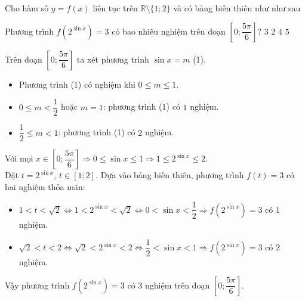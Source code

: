 \begin{ex}%
	Cho hàm số $y=f(x)$ liên tục trên $\mathbb{R}\setminus \{1;2\}$ và có bảng biến thiên như như sau
	\begin{center}
	\end{center}
	Phương trình $f(2^{\sin x})=3$ có bao nhiêu nghiệm trên đoạn $\left[0;\dfrac{5\pi}{6}\right]$?
	\choice
	{\True $3$}
	{$2$}
	{$4$}
	{$5$}
	\loigiai
	{
		Trên đoạn $\left[0;\dfrac{5\pi}{6}\right]$ ta xét phương trình $\sin x=m$ (1).
		\begin{itemize}
			\item Phương trình (1) có nghiệm khi $0\le m\le1$.
			\item $0\le m<\dfrac{1}{2}$ hoặc $m=1$: phương trình (1) có $1$ nghiệm.
			\item $\dfrac{1}{2}\le m <1$: phương trình (1) có $2$ nghiệm.
		\end{itemize}
		Với mọi $x \in \left[0;\dfrac{5\pi}{6}\right] \Rightarrow 0\le \sin x\le1 \Rightarrow 1\le2^{\sin x}\le2$. \\
		Đặt $t=2^{\sin x}$, $t \in [1;2]$.
		Dựa vào bảng biến thiên, phương trình $f(t)=3$ có hai nghiệm thỏa mãn:
		\begin{itemize}
			\item $1<t<\sqrt{2}\Leftrightarrow1<2^{\sin x}<\sqrt{2} \Leftrightarrow 0<\sin x<\dfrac{1}{2} \Rightarrow f(2^{\sin x})=3$ có $1$ nghiệm.
			\item $\sqrt{2}<t<2\Leftrightarrow\sqrt{2}<2^{\sin x}<2 \Leftrightarrow \dfrac{1}{2}<\sin x<1 \Rightarrow f(2^{\sin x})=3$ có $2$ nghiệm.
		\end{itemize}
		Vậy phương trình $f(2^{\sin x})=3$ có $3$ nghiệm trên đoạn $\left[0;\dfrac{5\pi}{6}\right]$.
	}
\end{ex}





